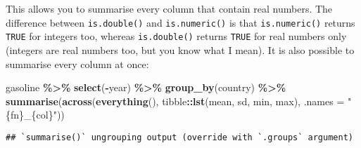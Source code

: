 \documentclass[
]{article}
\newenvironment{Shaded}{\begin{snugshade}}{\end{snugshade}}
\newcommand{\DataTypeTok}[1]{\textcolor[rgb]{0.13,0.29,0.53}{#1}}
\newcommand{\KeywordTok}[1]{\textcolor[rgb]{0.13,0.29,0.53}{\textbf{#1}}}
\newcommand{\NormalTok}[1]{#1}
\newcommand{\OperatorTok}[1]{\textcolor[rgb]{0.81,0.36,0.00}{\textbf{#1}}}
\newcommand{\StringTok}[1]{\textcolor[rgb]{0.31,0.60,0.02}{#1}}
\begin{document}
This allows you to summarise every column that contain real numbers. The difference between
\texttt{is.double()} and \texttt{is.numeric()} is that \texttt{is.numeric()} returns \texttt{TRUE} for integers too, whereas
\texttt{is.double()} returns \texttt{TRUE} for real numbers only (integers are real numbers too, but you know
what I mean). It is also possible to summarise every column at once:

\begin{Shaded}
\begin{Highlighting}[]
\NormalTok{gasoline }\OperatorTok{\%\textgreater{}\%}
\StringTok{  }\KeywordTok{select}\NormalTok{(}\OperatorTok{{-}}\NormalTok{year) }\OperatorTok{\%\textgreater{}\%}
\StringTok{  }\KeywordTok{group\_by}\NormalTok{(country) }\OperatorTok{\%\textgreater{}\%}
\StringTok{  }\KeywordTok{summarise}\NormalTok{(}\KeywordTok{across}\NormalTok{(}\KeywordTok{everything}\NormalTok{(), tibble}\OperatorTok{::}\KeywordTok{lst}\NormalTok{(mean, sd, min, max), }\DataTypeTok{.names =} \StringTok{"\{fn\}\_\{col\}"}\NormalTok{))}
\end{Highlighting}
\end{Shaded}

\begin{verbatim}
## `summarise()` ungrouping output (override with `.groups` argument)
\end{verbatim}
\end{document}
